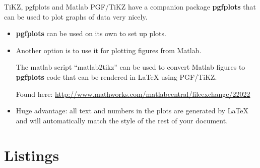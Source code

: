 \documentclass[english]{beamer}
\begin{document}
\begin{frame}{\insertsection}{TiKZ, pgfplots and Matlab}
  PGF/TiKZ have a companion package \textbf{pgfplots} that can be used
  to plot graphs of data very nicely.
  \begin{itemize}
  \item \textbf{pgfplots} can be used on its own to set up plots.
  \item Another option is to use it for plotting figures from Matlab.

    The matlab script ``matlab2tikz'' can be used to convert Matlab
    figures to \textbf{pgfplots} code that can be rendered in \LaTeX{}
    using PGF/TiKZ.

    Found here: \url{http://www.mathworks.com/matlabcentral/fileexchange/22022}
  \item Huge advantage: all text and numbers in the plots are
    generated by \LaTeX{} and will automatically match the style of
    the rest of your document.
  \end{itemize}
\end{frame}



\section{Listings}

\end{document}

